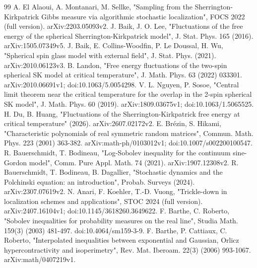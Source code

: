 \documentclass[11pt]{article}
\begin{document}
\begin{thebibliography}{99}
\small
{} A. El Alaoui, A. Montanari, M. Sellke, "Sampling from the Sherrington-Kirkpatrick Gibbs measure via algorithmic stochastic localization", FOCS 2022 (full version). arXiv:2203.05093v2.
 J. Baik, J. O. Lee, "Fluctuations of the free energy of the spherical Sherrington-Kirkpatrick model", J. Stat. Phys. 165 (2016). arXiv:1505.07349v5.
 J. Baik, E. Collins-Woodfin, P. Le Doussal, H. Wu, "Spherical spin glass model with external field", J. Stat. Phys. (2021). arXiv:2010.06123v3.
 B. Landon, "Free energy fluctuations of the two-spin spherical SK model at critical temperature", J. Math. Phys. 63 (2022) 033301. arXiv:2010.06691v1; doi:10.1063/5.0054298.
 V. L. Nguyen, P. Sosoe, "Central limit theorem near the critical temperature for the overlap in the 2-spin spherical SK model", J. Math. Phys. 60 (2019). arXiv:1809.03675v1; doi:10.1063/1.5065525.
 H. Du, B. Huang, "Fluctuations of the Sherrington-Kirkpatrick free energy at critical temperature" (2026). arXiv:2607.02172v2.
 E. Brézin, S. Hikami, "Characteristic polynomials of real symmetric random matrices", Commun. Math. Phys. 223 (2001) 363-382. arXiv:math-ph/0103012v1; doi:10.1007/s002200100547.
 R. Bauerschmidt, T. Bodineau, "Log-Sobolev inequality for the continuum sine-Gordon model", Comm. Pure Appl. Math. 74 (2021). arXiv:1907.12308v2.
 R. Bauerschmidt, T. Bodineau, B. Dagallier, "Stochastic dynamics and the Polchinski equation: an introduction", Probab. Surveys (2024). arXiv:2307.07619v2.
 N. Anari, F. Koehler, T.-D. Vuong, "Trickle-down in localization schemes and applications", STOC 2024 (full version). arXiv:2407.16104v1; doi:10.1145/3618260.3649622.
 F. Barthe, C. Roberto, "Sobolev inequalities for probability measures on the real line", Studia Math. 159(3) (2003) 481-497. doi:10.4064/sm159-3-9.
 F. Barthe, P. Cattiaux, C. Roberto, "Interpolated inequalities between exponential and Gaussian, Orlicz hypercontractivity and isoperimetry", Rev. Mat. Iberoam. 22(3) (2006) 993-1067. arXiv:math/0407219v1.

\end{thebibliography}
\end{document}
